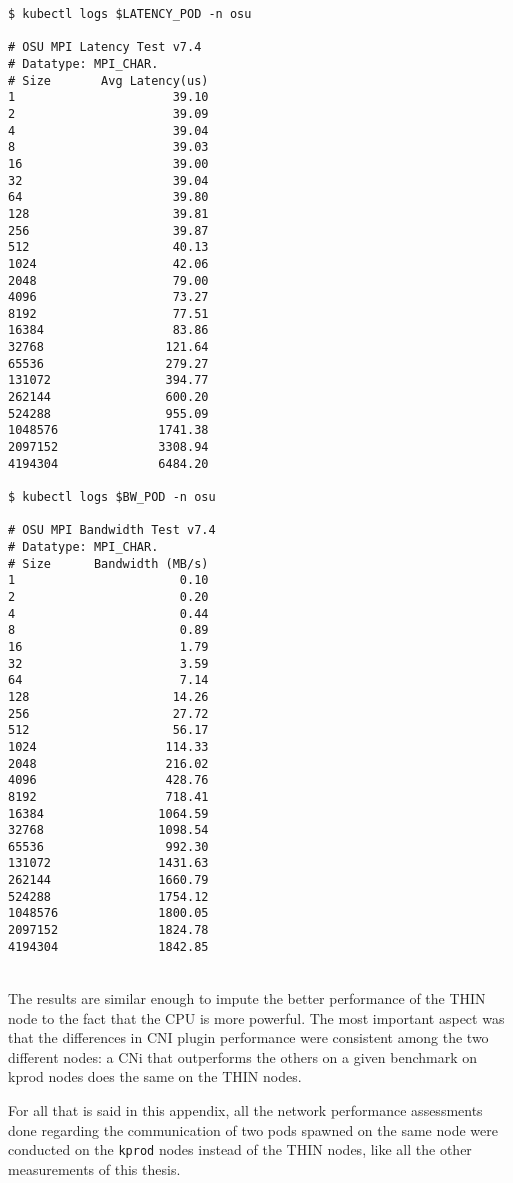 \begin{minipage}[t]{0.48\textwidth}
\begin{verbatim}
$ kubectl logs $LATENCY_POD -n osu

# OSU MPI Latency Test v7.4
# Datatype: MPI_CHAR.
# Size       Avg Latency(us)
1                      39.10
2                      39.09
4                      39.04
8                      39.03
16                     39.00
32                     39.04
64                     39.80
128                    39.81
256                    39.87
512                    40.13
1024                   42.06
2048                   79.00
4096                   73.27
8192                   77.51
16384                  83.86
32768                 121.64
65536                 279.27
131072                394.77
262144                600.20
524288                955.09
1048576              1741.38
2097152              3308.94
4194304              6484.20

$ kubectl logs $BW_POD -n osu

# OSU MPI Bandwidth Test v7.4
# Datatype: MPI_CHAR.
# Size      Bandwidth (MB/s)
1                       0.10
2                       0.20
4                       0.44
8                       0.89
16                      1.79
32                      3.59
64                      7.14
128                    14.26
256                    27.72
512                    56.17
1024                  114.33
2048                  216.02
4096                  428.76
8192                  718.41
16384                1064.59
32768                1098.54
65536                 992.30
131072               1431.63
262144               1660.79
524288               1754.12
1048576              1800.05
2097152              1824.78
4194304              1842.85
\end{verbatim}
\end{minipage}
\\

The results are similar enough to impute the better performance of the THIN node
to the fact that the CPU is more powerful. The most important aspect was that
the differences in CNI plugin performance were consistent among the two
different nodes: a CNi that outperforms the others on a given benchmark on kprod
nodes does the same on the THIN nodes.

For all that is said in this appendix, all the network performance assessments
done regarding the communication of two pods spawned on the same node were
conducted on the \texttt{kprod} nodes instead of the THIN nodes, like all the
other measurements of this thesis.

